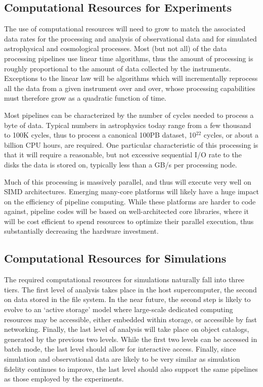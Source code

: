 \subsection{Computational Resources for Experiments}

The use of computational resources will need to grow to match the
associated data rates for the processing and analysis of observational
data and for simulated astrophysical and cosmological processes. Most
(but not all) of the data processing pipelines use linear time
algorithms, thus the amount of processing is roughly proportional to
the amount of data collected by the instruments. Exceptions to the
linear law will be algorithms which will incrementally reprocess all
the data from a given instrument over and over, whose processing
capabilities must therefore grow as a quadratic function of time.

Most pipelines can be characterized by the number of cycles needed to
process a byte of data. Typical numbers in astrophysics today range
from a few thousand to 100K cycles, thus to process a canonical 100PB
dataset, 10$^{22}$ cycles, or about a billion CPU hours, are
required. One particular characteristic of this processing is that it
will require a reasonable, but not excessive sequential I/O rate to
the disks the data is stored on, typically less than a GB/s per
processing node.

Much of this processing is massively parallel, and thus will execute
very well on SIMD architectures. Emerging many-core platforms will
likely have a huge impact on the efficiency of pipeline
computing. While these platforms are harder to code against, pipeline
codes will be based on well-architected core libraries, where it will
be cost efficient to spend resources to optimize their parallel
execution, thus substantially decreasing the hardware investment.

\subsection{Computational Resources for Simulations}

The required computational resources for simulations naturally fall
into three tiers. The first level of analysis takes place in the host
supercomputer, the second on data stored in the file system. In the
near future, the second step is likely to evolve to an `active
storage' model where large-scale dedicated computing resources may be
accessible, either embedded within storage, or accessible by fast
networking. Finally, the last level of analysis will take place on
object catalogs, generated by the previous two levels. While the first
two levels can be accessed in batch mode, the last level should allow
for interactive access. Finally, since simulation and observational
data are likely to be very similar as simulation fidelity continues to
improve, the last level should also support the same pipelines as
those employed by the experiments.

